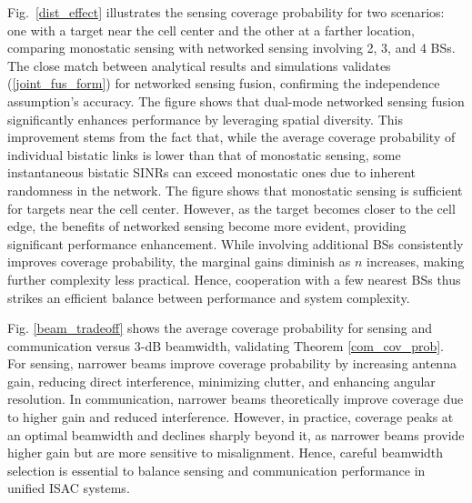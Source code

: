 \documentclass[journal]{IEEEtran}
\begin{document}
Fig.~\ref{dist_effect} illustrates the sensing coverage probability for two scenarios: one with a target near the cell center and the other at a farther location, comparing monostatic sensing with networked sensing involving 2, 3, and 4 BSs. The close match between analytical results and simulations validates (\ref{joint_fus_form}) for networked sensing fusion, confirming the independence assumption's accuracy. 
The figure shows that dual-mode networked sensing fusion significantly enhances performance by leveraging spatial diversity. This improvement stems from the fact that, while the average coverage probability of individual bistatic links is lower than that of monostatic sensing, some instantaneous bistatic SINRs can exceed monostatic ones due to inherent randomness in the network.
The figure shows that monostatic sensing is sufficient for targets near the cell center. However, as the target becomes closer to the cell edge, the benefits of networked sensing become more evident, providing significant performance enhancement. While involving additional BSs consistently improves coverage probability, the marginal gains diminish as $n$ increases, making further complexity less practical. Hence, cooperation with a few nearest BSs thus strikes an efficient balance between performance and system complexity.







Fig. \ref{beam_tradeoff} shows the average coverage probability for sensing and communication versus 3-dB beamwidth, validating Theorem \ref{com_cov_prob}. For sensing, narrower beams improve coverage probability by increasing antenna gain, reducing direct interference, minimizing clutter, and enhancing angular resolution. In communication, narrower beams theoretically improve coverage due to higher gain and reduced interference. However, in practice, coverage peaks at an optimal beamwidth and declines sharply beyond it, as narrower beams provide higher gain but are more sensitive to misalignment.  Hence, careful beamwidth selection is essential to balance sensing and communication performance in unified ISAC systems.
\end{document}
